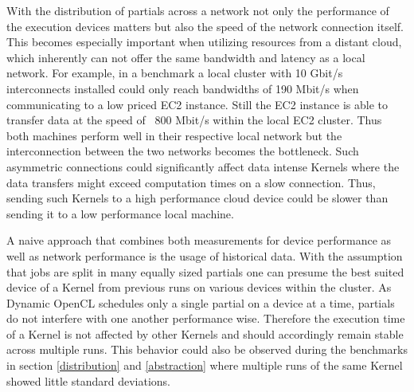 With the distribution of partials across a network not only the performance of the execution devices matters but also the speed of the network connection itself. This becomes especially important when utilizing resources from a distant cloud, which inherently can not offer the same bandwidth and latency as a local network. For example, in a benchmark a local cluster with 10 Gbit/s interconnects installed could only reach bandwidths of 190 Mbit/s when communicating to a low priced EC2 instance. Still the EC2 instance is able to transfer data at the speed of ~800 Mbit/s within the local EC2 cluster. Thus both machines perform well in their respective local network but the interconnection between the two networks becomes the bottleneck. Such asymmetric connections could significantly affect data intense Kernels where the data transfers might exceed computation times on a slow connection. Thus, sending such Kernels to a high performance cloud device could be slower than sending it to a low performance local machine.

A naive approach that combines both measurements for device performance as well as network performance is the usage of historical data. With the assumption that jobs are split in many equally sized partials one can presume the best suited device of a Kernel from previous runs on various devices within the cluster. As Dynamic OpenCL schedules only a single partial on a device at a time, partials do not interfere with one another performance wise. Therefore the execution time of a Kernel is not affected by other Kernels and should accordingly remain stable across multiple runs. This behavior could also be observed during the benchmarks in section \ref{distribution} and \ref{abstraction} where multiple runs of the same Kernel showed little standard deviations.

